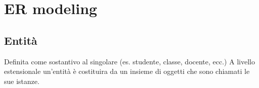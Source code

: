 \chapter{ER modeling}
\section{Entità}
Definita come sostantivo al singolare (es. studente, classe, docente, ecc.)
A livello estensionale un'entità è costituira da un insieme di oggetti 
che sono chiamati le sue istanze.